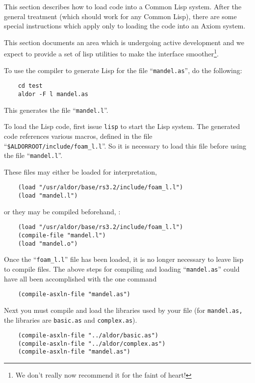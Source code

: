 
This section describes how to load \asharp{} code into a Common Lisp
system.  After the general treatment (which should work for any
Common Lisp), there are some special instructions which apply only
to loading the code into an {\sc Axiom} system.

This section documents an area which is undergoing active development
and we expect to provide a set of lisp utilities to make the interface
smoother\footnote{We don't really now recommend it for the faint of
heart!}.

To use the compiler to generate Lisp for the file ``{\tt mandel.as}'',
do the following:
\begin{verbatim}
    cd test
    aldor -F l mandel.as
\end{verbatim}
This generates the file ``{\tt mandel.l}''.

To load the Lisp code, first issue {\tt lisp} to start the
Lisp system.  
The generated code references various macros, defined in the file
``{\tt \$ALDORROOT/include/foam\_l.l}''.
So it is necessary to load this file before using the file ``{\tt mandel.l}''.

These files may either be loaded for interpretation,
\begin{verbatim}
    (load "/usr/aldor/base/rs3.2/include/foam_l.l")
    (load "mandel.l")
\end{verbatim}
or they may be compiled beforehand, \eg{}:
\begin{verbatim}
    (load "/usr/aldor/base/rs3.2/include/foam_l.l")
    (compile-file "mandel.l")
    (load "mandel.o")
\end{verbatim}

Once the ``{\tt foam\_l.l}'' file has been loaded, it is no longer necessary to
leave lisp to compile \asharp{} files. 
The above steps for compiling and loading ``{\tt mandel.as}'' could have all
been accomplished with the one command
\begin{verbatim}
    (compile-asxln-file "mandel.as")
\end{verbatim}

Next you must compile and load the libraries used by your file
(for {\tt mandel.as,} the libraries are {\tt basic.as} and
{\tt complex.as}).
\begin{verbatim}
    (compile-asxln-file "../aldor/basic.as")
    (compile-asxln-file "../aldor/complex.as")
    (compile-asxln-file "mandel.as")
\end{verbatim}

